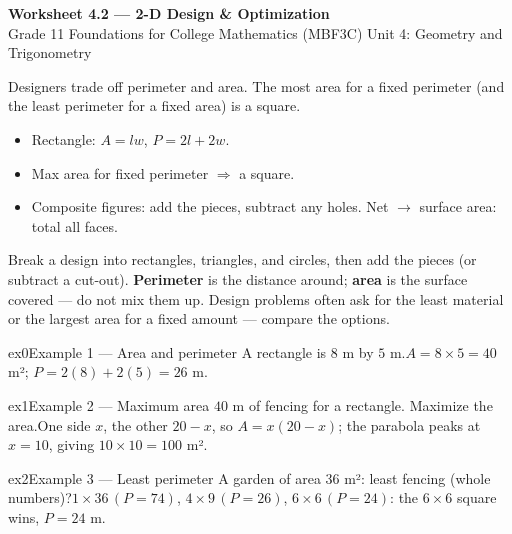 \documentclass[11pt]{article}
\begin{document}
\begin{center}
{\LARGE\bfseries\color{titleblue}Worksheet 4.2 --- 2-D Design \& Optimization}\\[2pt]
{\small Grade 11 Foundations for College Mathematics (MBF3C) \textperiodcentered{} Unit 4: Geometry and Trigonometry}
\end{center}

\begin{ideabox}
Designers trade off perimeter and area. The most area for a fixed perimeter (and the least perimeter for a fixed area) is a square.
\begin{itemize}[leftmargin=*,itemsep=2pt]
  \item Rectangle: $A=lw$, $P=2l+2w$.
  \item Max area for fixed perimeter $\Rightarrow$ a square.
  \item Composite figures: add the pieces, subtract any holes. Net $\to$ surface area: total all faces.
\end{itemize}
\end{ideabox}

\begin{learnbox}
Break a design into rectangles, triangles, and circles, then add the pieces (or subtract a cut-out).
\textbf{Perimeter} is the distance around; \textbf{area} is the surface covered — do not mix them up.
Design problems often ask for the least material or the largest area for a fixed amount — compare the options.
\end{learnbox}


\begin{example}{ex0}{Example 1 --- Area and perimeter}
A rectangle is $8$ m by $5$ m.\soln $A=8\times5=40$ m²; $P=2(8)+2(5)=26$ m.
\end{example}

\begin{example}{ex1}{Example 2 --- Maximum area}
$40$ m of fencing for a rectangle. Maximize the area.\soln One side $x$, the other $20-x$, so $A=x(20-x)$; the parabola peaks at $x=10$, giving $10\times10=100$ m².
\end{example}

\begin{example}{ex2}{Example 3 --- Least perimeter}
A garden of area $36$ m²: least fencing (whole numbers)?\soln $1{\times}36\,(P{=}74)$, $4{\times}9\,(P{=}26)$, $6{\times}6\,(P{=}24)$: the $6\times6$ square wins, $P=24$ m.
\end{example}
\end{document}
